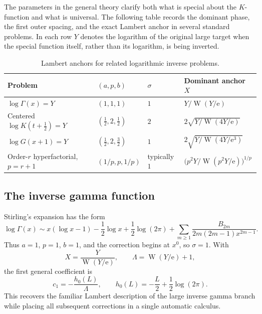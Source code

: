 \documentclass[11pt,oneside]{article}
\theoremstyle{plain}
\theoremstyle{definition}
\theoremstyle{remark}
\newcommand{\W}{\operatorname{W}}
\newcommand{\e}{\mathrm{e}}
\begin{document}
The parameters in the general theory clarify both what is special about the
\(K\)-function and what is universal.  The following table records the dominant
phase, the first outer spacing, and the exact Lambert anchor in several
standard problems.  In each row \(Y\) denotes the logarithm of the original
large target when the special function itself, rather than its logarithm, is
being inverted.

\begin{table}[htbp]
\centering
\small
\caption{Lambert anchors for related logarithmic inverse problems.}
\label{tab:neighboring-anchors}
\begin{tabularx}{\textwidth}{@{}>{\raggedright\arraybackslash}p{}
  >{\centering\arraybackslash}p{}
  >{\centering\arraybackslash}p{}
  >{\centering\arraybackslash}X@{}}
\toprule
Problem & \((a,p,b)\) & \(\sigma\) & Dominant anchor \(X\) \\
\midrule
\(\log\Gamma(x)=Y\)
 & \((1,1,1)\) & \(1\)
 & \(Y/\W(Y/\e)\) \\
Centered \(\log K(t+\tfrac12)=Y\)
 & \((\tfrac12,2,\tfrac12)\) & \(2\)
 & \(2\sqrt{Y/\W(4Y/\e)}\) \\
\(\log G(x+1)=Y\)
 & \((\tfrac12,2,\tfrac32)\) & \(1\)
 & \(2\sqrt{Y/\W(4Y/\e^3)}\) \\
Order-\(r\) hyperfactorial, \(p=r+1\)
 & \((1/p,p,1/p)\) & typically \(1\)
 & \(\bigl(p^2Y/\W(p^2Y/\e)\bigr)^{1/p}\) \\
\bottomrule
\end{tabularx}
\end{table}

\subsection{The inverse gamma function}

Stirling's expansion has the form
\begin{equation}
 \log\Gamma(x)
 \sim x(\log x-1)-\frac12\log x+\frac12\log(2\pi)
 +\sum_{m\ge1}\frac{B_{2m}}{2m(2m-1)x^{2m-1}}.
 \label{eq:gamma-general-example}
\end{equation}
Thus \(a=1\), \(p=1\), \(b=1\), and the correction begins at
\(x^0\), so \(\sigma=1\).  With
\begin{equation}
 X=\frac{Y}{\W(Y/\e)},
 \qquad
 \Lambda=\W(Y/\e)+1,
 \label{eq:gamma-anchor-example}
\end{equation}
the first general coefficient is
\begin{equation}
 c_1=-\frac{h_0(L)}{\Lambda},
 \qquad
 h_0(L)=-\frac L2+\frac12\log(2\pi).
 \label{eq:gamma-c1-example}
\end{equation}
This recovers the familiar Lambert description of the large inverse gamma
branch while placing all subsequent corrections in a single automatic
calculus.
\end{document}
